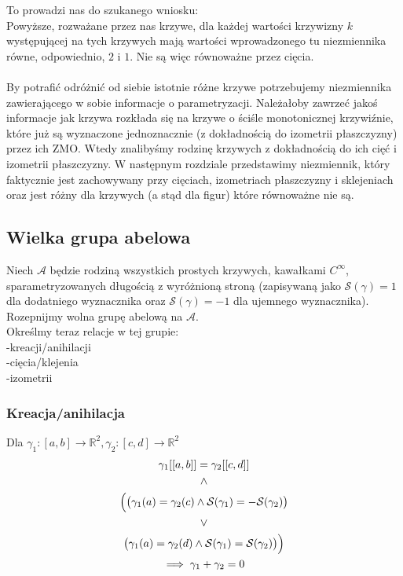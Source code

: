 \documentclass[a4paper, 12pt, twosided]{article}
\begin{document}
To prowadzi nas do szukanego wniosku: \\
Powyższe, rozważane przez nas krzywe, dla każdej wartości krzywizny $k$ występującej na tych 
krzywych mają wartości wprowadzonego tu niezmiennika równe, odpowiednio, $2$ i $1$. Nie są 
więc równoważne przez cięcia. \\
\\[4pt]
By potrafić odróżnić od siebie istotnie różne krzywe potrzebujemy niezmiennika zawierającego w sobie
informacje o parametryzacji. Należałoby zawrzeć jakoś informacje jak krzywa rozkłada się na krzywe 
 o 
ściśle
monotonicznej krzywiźnie, które już są wyznaczone jednoznacznie (z dokładnością do izometrii 
 płaszczyzny) przez ich ZMO.
Wtedy znalibyśmy rodzinę krzywych z dokładnością do ich cięć i izometrii płaszczyzny.
W następnym rozdziale przedstawimy niezmiennik, który faktycznie jest zachowywany przy cięciach,
izometriach płaszczyzny i
 sklejeniach oraz jest różny dla krzywych (a stąd dla figur) które równoważne nie są.

\subsection{Wielka grupa abelowa}
Niech $\mathcal{A}$ będzie rodziną wszystkich
prostych krzywych, kawałkami $C^\infty$, sparametryzowanych długością z wyróżnioną stroną
(zapisywaną jako $\mathcal{S}(\gamma) = 1$ dla dodatniego wyznacznika oraz $\mathcal{S}
(\gamma)=-1$ dla ujemnego wyznacznika). \\
Rozepnijmy wolna grupę abelową na $\mathcal{A}$. \\
Określmy teraz relacje w tej grupie: \\
-kreacji/anihilacji \\
-cięcia/klejenia \\
-izometrii 
\subsubsection{Kreacja/anihilacja}
Dla $\gamma_1 : [a, b] \to \mathbb{R}^2, \gamma_2 : [c, d] \to \mathbb{R}^2$
\begin{gather}
    \gamma_1[[a,b]]=\gamma_2[[c,d]] \notag\\\land\notag\\
    \Big(\big( \gamma_1(a) = \gamma_2(c) \land \mathcal{S}(\gamma_1)=-\mathcal{S}(\gamma_2)\big) \\
    \lor \notag\\
    \big(\gamma_1(a) = \gamma_2(d) \land \mathcal{S}(\gamma_1)=\mathcal{S}(\gamma_2) \big)\Big)
    \notag\\
     \implies \gamma_1 + \gamma_2 = 0\notag
\end{gather}
\end{document}
